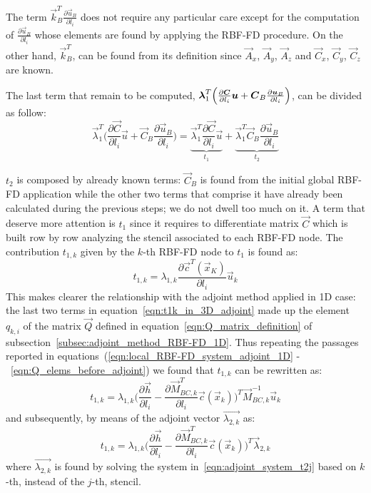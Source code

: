 \medskip
The term $\vec{k}_B^T \frac{\partial \vec{u}_B}{\partial l_i}$ does not require any particular care except for the computation of $\frac{\partial \vec{u}_B}{\partial l_i}$ whose elements are found by applying the RBF-FD procedure. On the other hand, $\vec{k}_B^T$, can be found from its definition since $\vec{A}_x$, $\vec{A}_y$, $\vec{A}_z$ and $\vec{C}_x$, $\vec{C}_y$, $\vec{C}_z$ are known.

\medskip
The last term that remain to be computed, $\vec{\lambda}_1^T \Bigl( \frac{\partial \vec{C}}{\partial l_i}\vec{u} + \vec{C}_B\frac{\partial \vec{u}_B}{\partial l_i} \Bigr)$, can be divided as follow:
\begin{equation}
	\vec{\lambda}_1^T \biggl( \frac{\partial \vec{C}}{\partial l_i}\vec{u} + \vec{C}_B\frac{\partial \vec{u}_B}{\partial l_i} \biggr) = \underbrace{\vec{\lambda}_1^T \frac{\partial \vec{C}}{\partial l_i} \vec{u}}_{t_1} + \underbrace{\vec{\lambda}_1^T \vec{C}_B \frac{\partial \vec{u}_B}{\partial l_i}}_{t_2}
\end{equation}

$t_2$ is composed by already known terms: $\vec{C}_B$ is found from the initial global RBF-FD application while the other two terms that comprise it have already been calculated during the previous steps; we do not dwell too much on it. A term that deserve more attention is $t_1$ since it requires to differentiate matrix $\vec{C}$ which is built row by row analyzing the stencil associated to each RBF-FD node.
The contribution $t_{1,k}$ given by the $k$-th RBF-FD node to $t_1$ is found as:
\begin{equation}
	\label{eqn:t1k_in_3D_adjoint}
	t_{1,k} = \lambda_{1,k} \frac{\partial \vec{c}^T(\vec{x}_K)}{\partial l_i} \vec{u}_k
\end{equation}
This makes clearer the relationship with the adjoint method applied in 1D case: the last two terms in equation~\eqref{eqn:t1k_in_3D_adjoint} made up the element $q_{k,i}$ of the matrix $\vec{Q}$ defined in equation~\eqref{eqn:Q_matrix_definition} of subsection~\ref{subsec:adjoint_method_RBF-FD_1D}. Thus repeating the passages reported in equations~(\ref{eqn:local_RBF-FD_system_adjoint_1D} -~\ref{eqn:Q_elems_before_adjoint}) we found that $t_{1,k}$ can be rewritten as:
\begin{equation}
	t_{1,k} = \lambda_{1,k} \biggl( \frac{\partial \vec{h}}{\partial l_i} - \frac{\partial \vec{M}_{BC,k}^T}{\partial l_i} \vec{c}(\vec{x}_k) \biggr)^T \vec{M}_{BC,k}^{-1} \vec{u}_k
\end{equation}
and subsequently, by means of the adjoint vector $\vec{\lambda_{2,k}}$ as:
\begin{equation}
	t_{1,k} = \lambda_{1,k} \biggl( \frac{\partial \vec{h}}{\partial l_i} - \frac{\partial \vec{M}_{BC,k}^T}{\partial l_i} \vec{c}(\vec{x}_k) \biggr)^T \vec{\lambda}_{2,k}
\end{equation}
where $\vec{\lambda_{2,k}}$ is found by solving the system in~\eqref{eqn:adjoint_system_t2j} based on $k$-th, instead of the $j$-th, stencil.

